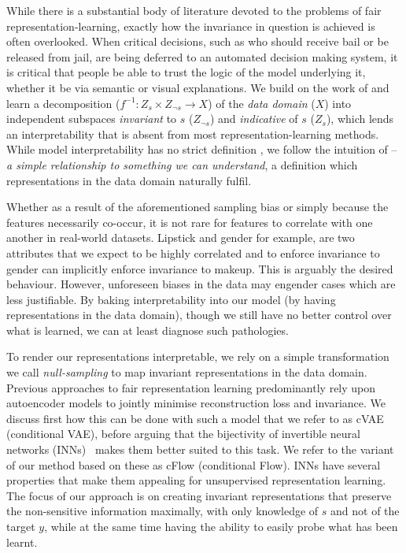 While there is a substantial body of literature devoted to the problems of fair representation-learning, exactly how the invariance in question is achieved is often overlooked. 
When critical decisions, such as who should receive bail or be released from jail, are being deferred to an automated decision making system, it is critical that people be able to trust the logic of the model underlying it, whether it be via semantic or visual explanations. 
We build on the work of \citet{QuaShaTho19} and learn a decomposition ($f^{-1}: Z_s \times Z_{\neg s} \rightarrow X$) of the \emph{data domain} ($X$) into independent subspaces \emph{invariant} to  $s$ ($Z_{\neg s}$) and \emph{indicative} of $s$ ($Z_{s}$), which lends an interpretability that is absent from most representation-learning methods.
While model interpretability has no strict definition \citep{zhang2018visual}, we follow the intuition of \citet{adel2018discovering} -- \emph{a simple relationship to something we can understand}, a definition which representations in the data domain naturally fulfil.

Whether as a result of the aforementioned sampling bias or simply because the features necessarily co-occur, it is not rare for features to correlate with one another in real-world datasets.
Lipstick and gender for example, are two attributes that we expect to be highly correlated and to enforce invariance to gender can implicitly enforce invariance to makeup.
This is arguably the desired behaviour.
However, unforeseen biases in the data may engender cases which are less justifiable.
By baking interpretability into our model (by having representations in the data domain), though we still have no better control over what is learned, we can at least diagnose such pathologies.

To render our representations interpretable, we rely on a simple transformation we call \emph{null-sampling} to map invariant representations in the data domain.
Previous approaches to fair representation learning \citep{beutel2017data,edwards2016censoring,madras2018learning,louizos2016variational} predominantly rely upon autoencoder models to jointly minimise reconstruction loss and invariance.
We discuss first how this can be done with such a model that we refer to as cVAE (conditional VAE),
before arguing that the bijectivity of invertible neural networks (INNs)~\citep{Dinh2014} makes them better suited to this task. 
We refer to the variant of our method based on these as cFlow (conditional Flow).
INNs have several properties that make them appealing for unsupervised representation learning. 
The focus of our approach is on creating invariant representations that preserve the non-sensitive information maximally, with only knowledge of $s$ and not of the target $y$, while at the same time having the ability to easily probe what has been learnt.

